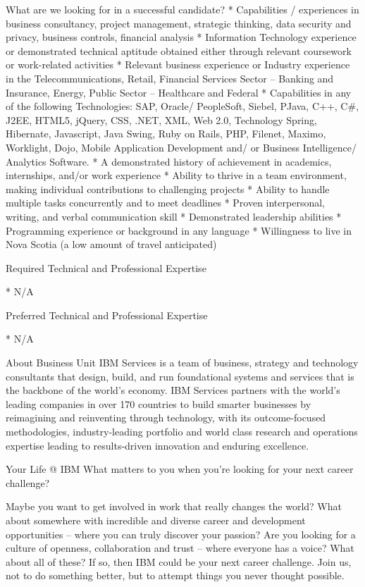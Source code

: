What are we looking for in a successful candidate?
* Capabilities / experiences in business consultancy, project management, strategic thinking, data security and privacy, business controls, financial analysis
* Information Technology experience or demonstrated technical aptitude obtained either through relevant coursework or work-related activities
* Relevant business experience or Industry experience in the Telecommunications, Retail, Financial Services Sector – Banking and Insurance, Energy, Public Sector – Healthcare and Federal
* Capabilities in any of the following Technologies: SAP, Oracle/ PeopleSoft, Siebel, PJava, C++, C#, J2EE, HTML5, jQuery, CSS, .NET, XML, Web 2.0, Technology Spring, Hibernate, Javascript, Java Swing, Ruby on Rails, PHP, Filenet, Maximo, Worklight, Dojo, Mobile Application Development and/ or Business Intelligence/ Analytics Software.
* A demonstrated history of achievement in academics, internships, and/or work experience
* Ability to thrive in a team environment, making individual contributions to challenging projects
* Ability to handle multiple tasks concurrently and to meet deadlines
* Proven interpersonal, writing, and verbal communication skill
* Demonstrated leadership abilities
* Programming experience or background in any language
* Willingness to live in Nova Scotia (a low amount of travel anticipated)



Required Technical and Professional Expertise

* N/A



Preferred Technical and Professional Expertise

* N/A



About Business Unit
IBM Services is a team of business, strategy and technology consultants that design, build, and run foundational systems and services that is the backbone of the world's economy. IBM Services partners with the world's leading companies in over 170 countries to build smarter businesses by reimagining and reinventing through technology, with its outcome-focused methodologies, industry-leading portfolio and world class research and operations expertise leading to results-driven innovation and enduring excellence.


Your Life @ IBM
What matters to you when you’re looking for your next career challenge?

Maybe you want to get involved in work that really changes the world? What about somewhere with incredible and diverse career and development opportunities – where you can truly discover your passion? Are you looking for a culture of openness, collaboration and trust – where everyone has a voice? What about all of these? If so, then IBM could be your next career challenge. Join us, not to do something better, but to attempt things you never thought possible.

